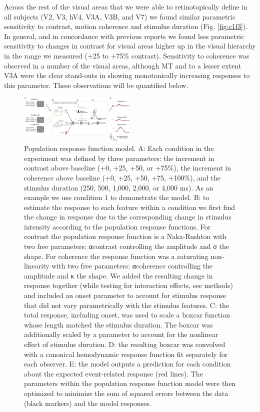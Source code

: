 \documentclass{report}
\begin{document}
Across the rest of the visual areas that we were able to retinotopically define in all subjects (V2, V3, hV4, V3A, V3B, and V7) we found similar parametric sensitivity to contrast, motion coherence and stimulus duration (Fig. \ref{fig:c1f3}). In general, and in concordance with previous reports \citep{Avidan2002-jg} we found less parametric sensitivity to changes in contrast for visual areas higher up in the visual hierarchy in the range we measured (+25 to +75\% contrast). Sensitivity to coherence was observed in a number of the visual areas, although MT and to a lesser extent V3A were the clear stand-outs in showing monotonically increasing responses to this parameter. These observations will be quantified below.

\begin{figure}
\centering
\includegraphics[keepaspectratio,width=0.5\textwidth]{figs_c1/Fig4_model.pdf}
\caption[Population response function model]{Population response function model. A: Each condition in the experiment was defined by three parameters: the increment in contrast above baseline (+0, +25, +50, or +75\%), the increment in coherence above baseline (+0, +25, +50, +75, +100\%), and the stimulus duration (250, 500, 1,000, 2,000, or 4,000 ms). As an example we use condition 1 to demonstrate the model. B: to estimate the response to each feature within a condition we first find the change in response due to the corresponding change in stimulus intensity according to the population response functions. For contrast the population response function is a Naka-Rushton with two free parameters: αcontrast controlling the amplitude and σ the shape. For coherence the response function was a saturating non-linearity with two free parameters: αcoherence controlling the amplitude and κ the shape. We added the resulting change in response together (while testing for interaction effects, see methods) and included an onset parameter to account for stimulus response that did not vary parametrically with the stimulus features. C: the total response, including onset, was used to scale a boxcar function whose length matched the stimulus duration. The boxcar was additionally scaled by a parameter to account for the nonlinear effect of stimulus duration. D: the resulting boxcar was convolved with a canonical hemodynamic response function fit separately for each observer. E: the model outputs a prediction for each condition about the expected event-related response (red lines). The parameters within the population response function model were then optimized to minimize the sum of squared errors between the data (black markers) and the model responses.}
\label{fig:c1f4}
\end{figure}
\end{document}

